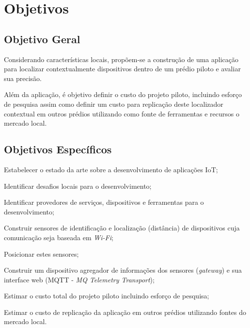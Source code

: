 
\section{Objetivos}
\label{sec:Objetivos}

\subsection{Objetivo Geral}
\label{subsec:Objetivo Geral}

Considerando características locais, propõem-se a construção de uma aplicação
para localizar contextualmente dispositivos dentro de um prédio piloto e avaliar
sua precisão.

Além da aplicação, é objetivo definir o custo do projeto piloto, incluindo
esforço de pesquisa assim como definir um custo para replicação deste
localizador contextual em outros prédios utilizando como fonte de ferramentas e
recursos o mercado local.

\subsection{Objetivos Específicos}
\label{subsec:Objetivos Específicos}

\begin{alineas}

	\item Estabelecer o estado da arte sobre a desenvolvimento de aplicações IoT;

	\item Identificar desafios locais para o desenvolvimento;

	\item Identificar provedores de serviços, dispositivos e ferramentas para o
desenvolvimento;

	\item Construir sensores de identificação e localização (distância) de
 dispositivos cuja comunicação seja baseada em \emph{Wi-Fi};

	\item Posicionar estes sensores;

	\item Construir um dispositivo agregador de informações dos sensores
 (\emph{gateway}) e sua interface web (MQTT - \emph{MQ Telemetry Transport});

	\item Estimar o custo total do projeto piloto incluindo esforço de pesquisa;

	\item Estimar o custo de replicação da aplicação em outros prédios
	utilizando fontes do mercado local.

\end{alineas}
